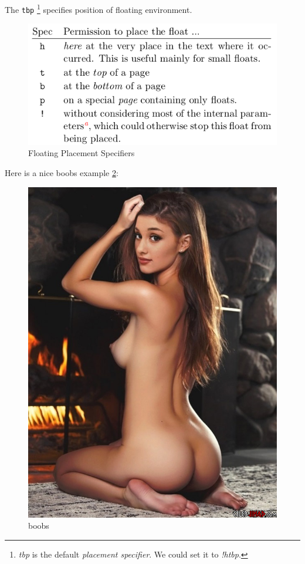 The \verb|tbp| \footnote{\textit{tbp} is the default
  \textit{placement specifier}. We could set it to
  \textit{!htbp}.} specifies position of floating environment.

\begin{figure}[h]
  \centering
  \includegraphics[width=.5\textwidth]{floating}
  \caption{Floating Placement Specifiers}
  \label{fig:placement-specifiers}
\end{figure}

Here is a nice boobs example \ref{fig:boobs}:

\begin{figure}[!htbp]
  \centering
  \includegraphics[scale=.3]{boobs}
  \caption{boobs}
  \label{fig:boobs}
\end{figure}

